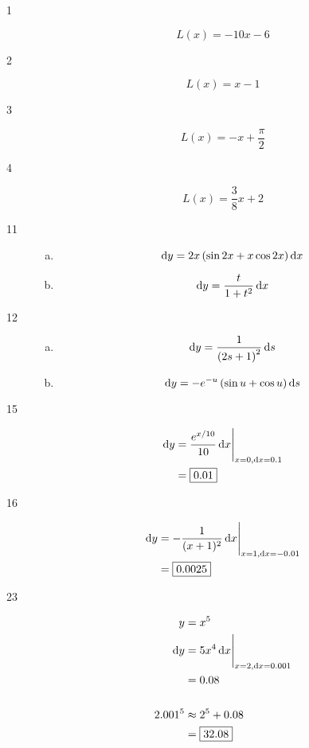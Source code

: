 \documentclass[letterpaper, landscape]{exam}
\newcommand{\dx}{\dif x}
\newcommand{\dy}{\dif y}
\begin{document}
  \begin{description}
    \item[1] 
      \[
        L(x) = -10x - 6
      \]

    \item[2] 
      \[
        L(x) = x - 1
      \]

    \item[3] 
      \[
        L(x) = -x + \frac{\pi}{2} 
      \]

    \item[4] 
      \[
        L(x) = \frac{3}{8} x + 2
      \]

    \item[11]
      \begin{enumerate}[(a)]
        \item 
          \[
            \dy = 2x \del{ \sin 2x + x \cos 2x } \dx
          \]

        \item
          \[
            \dy = \frac{t}{1 + t^2} \dx
          \]

      \end{enumerate}

    \item[12]
      \begin{enumerate}[(a)]
        \item 
          \[
            \dy = \frac{1}{\del{2s + 1}^2} \dif s
          \]

        \item
          \[
            \dy = - e^{-u} \del{\sin u + \cos u} \dif s
          \]

      \end{enumerate}

    \item[15]
      \begin{align*}
        \dy & = \eval{ \frac{e^{x/10}}{10} \dx }_{x = 0, \dx = 0.1} \\
            & = \boxed{ 0.01 } \\
      \end{align*}

    \item[16]
      \begin{align*}
        \dy & = \eval{ -\frac{1}{(x+1)^2} \dx }_{x = 1, \dx = -0.01} \\
            & = \boxed{ 0.0025 } \\
      \end{align*}

    \item[23]
      \begin{align*}
        y       & = x^5 \\
        \dy     & =  \eval{ 5x^4 \dx }_{x = 2, \dx = 0.001} \\
                & = 0.08 \\
        \\
        2.001^5 & \approx 2^5 + 0.08 \\
                & = \boxed{ 32.08 } \\
      \end{align*}


\end{description}
\end{document}
